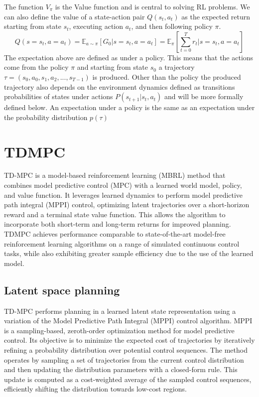 \documentclass{article}
\begin{document}
The function $V_\pi$ is the Value function and is central to solving RL problems.
We can also define the value of a state-action pair $Q(s_t,a_t)$ as the expected return starting from state $s_t$, executing action $a_t$, and then following policy $\pi$. 
\begin{equation}
Q(s=s_t,a=a_t) =\mathbb{E}_{a \sim \pi}[G_0|s=s_t,a=a_t] = \mathbb{E}_\pi[\sum_{t=0}^Tr_t|s=s_t,a=a_t]
\end{equation}
The expectation above are defined as under a policy. This means that the actions come from the policy $\pi$ and starting from state $s_0$ a trajectory $\tau=(s_0,a_0,s_1,a_2,...,s_{T-1})$ is produced. Other than the policy the  produced trajectory also depends on the environment dynamics defined as transitions probabilities of states under actions $P(s_{t+1}|s_t,a_t)$ and will be more formally defined below. An expectation under a policy is the same as an expectation under the probability distribution $p(\tau)$ 


\section{TDMPC}

TD-MPC is a model-based reinforcement learning (MBRL) method that combines model predictive control (MPC) with a learned world model, policy, and value function. It leverages learned dynamics to perform model predictive path integral (MPPI) control, optimizing latent trajectories over a short-horizon reward and a terminal state value function. This allows the algorithm to incorporate both short-term and long-term returns for improved planning. TDMPC achieves performance comparable to state-of-the-art model-free reinforcement learning algorithms on a range of simulated continuous control tasks, while also exhibiting greater sample efficiency due to the use of the learned model.

\subsection{Latent space planning}
TD-MPC performs planning in a learned latent state representation using a variation of the Model Predictive Path Integral (MPPI) control algorithm. MPPI is a sampling-based, zeroth-order optimization method for model predictive control. Its objective is to minimize the expected cost of trajectories by iteratively refining a probability distribution over potential control sequences. The method operates by sampling a set of trajectories from the current control distribution and then updating the distribution parameters with a closed-form rule. This update is computed as a cost-weighted average of the sampled control sequences, efficiently shifting the distribution towards low-cost regions.
\end{document}
